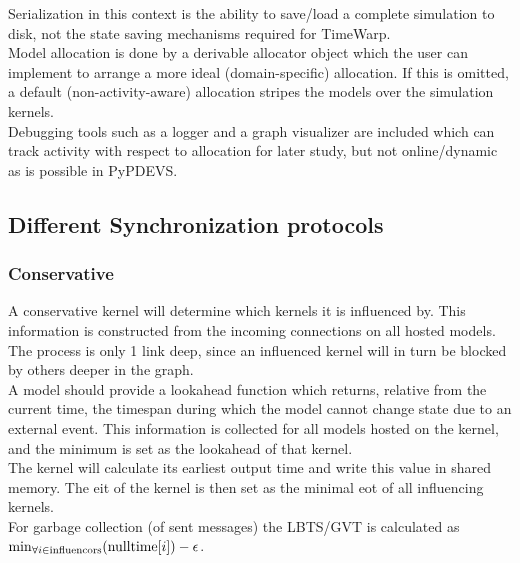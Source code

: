 Serialization in this context is the ability to save/load a complete simulation to disk, not the state saving mechanisms required for TimeWarp. %
\\
Model allocation is done by a derivable allocator object which the user can implement to arrange a more ideal (domain-specific) allocation. If this is omitted, a default (non-activity-aware) allocation stripes the models over the simulation kernels.\\
Debugging tools such as a logger and a graph visualizer are included which can track activity with respect to allocation for later study, but not online/dynamic as is possible in PyPDEVS.

\subsection{Different Synchronization protocols}
\subsubsection{Conservative}
A conservative kernel will determine which kernels it is influenced by. This information is constructed from the incoming connections on all hosted models. The process is only 1 link deep, since an influenced kernel will in turn be blocked by others deeper in the graph.\\
A model should provide a lookahead function which returns, relative from the current time, the timespan during which the model cannot change state due to an external event. This information is collected for all models hosted on the kernel, and the minimum is set as the lookahead of that kernel. \\
The kernel will calculate its earliest output time and write this value in shared memory. The eit of the kernel is then set as the minimal eot of all influencing kernels. \\
For garbage collection (of sent messages) the LBTS/GVT is calculated as $\min_{\forall i \in \textup{influencors}}( \textup{nulltime}[i])  - \epsilon $.\\

